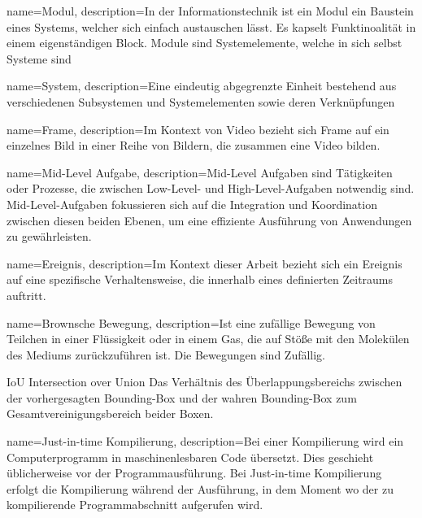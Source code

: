 
{
        name=Modul,
        description={In der Informationstechnik ist ein Modul ein Baustein eines Systems, welcher sich einfach austauschen lässt. Es kapselt Funktinoalität in einem eigenständigen Block. Module sind Systemelemente, welche in sich selbst Systeme sind}
}

{
        name=System,
        description={Eine eindeutig abgegrenzte Einheit bestehend aus verschiedenen Subsystemen und Systemelementen sowie deren Verknüpfungen}
}

{
        name=Frame,
        description={Im Kontext von Video bezieht sich Frame auf ein einzelnes Bild in einer Reihe von Bildern, die zusammen eine Video bilden.}
}

{
        name=Mid-Level Aufgabe,
        description={Mid-Level Aufgaben sind Tätigkeiten oder Prozesse, die zwischen Low-Level- und High-Level-Aufgaben notwendig sind. Mid-Level-Aufgaben fokussieren sich auf die Integration und Koordination zwischen diesen beiden Ebenen, um eine effiziente Ausführung von Anwendungen zu gewährleisten.}
}

{
        name=Ereignis,
        description={Im Kontext dieser Arbeit bezieht sich ein Ereignis auf eine spezifische Verhaltensweise, die innerhalb eines definierten Zeitraums auftritt.}
}

{
        name=Brownsche Bewegung,
        description={Ist eine zufällige Bewegung von Teilchen in einer Flüssigkeit oder in einem Gas, die auf Stöße mit den Molekülen des Mediums zurückzuführen ist. Die Bewegungen sind Zufällig.}
}

\newglossaryentrywithacronym
{IoU}
{Intersection over Union}
{Das Verhältnis des Überlappungsbereichs zwischen der vorhergesagten Bounding-Box und der wahren Bounding-Box zum Gesamtvereinigungsbereich beider Boxen.}

{
        name=Just-in-time Kompilierung,
        description={Bei einer Kompilierung wird ein Computerprogramm in maschinenlesbaren Code übersetzt. Dies geschieht üblicherweise vor der Programmausführung. Bei Just-in-time Kompilierung erfolgt die Kompilierung während der Ausführung, in dem Moment wo der zu kompilierende Programmabschnitt aufgerufen wird.}
}

